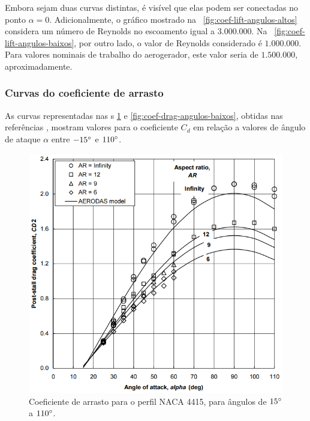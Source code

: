 \documentclass{article}
\begin{document}
	Embora sejam duas curvas distintas, é visível que elas podem ser conectadas no ponto $\alpha = 0$.
	Adicionalmente, o gráfico mostrado na \figurename\ \ref{fig:coef-lift-angulos-altos} considera um número de Reynolds no escoamento
	igual a $3.000.000$.
	Na \figurename\ \ref{fig:coef-lift-angulos-baixos}, por outro lado, o valor de Reynolds considerado é $1.000.000$.
	Para valores nominais de trabalho do aerogerador, este valor seria de $1.500.000$, aproximadamente.

	\subsubsection{Curvas do coeficiente de arrasto}
	As curvas representadas nas \figurename s \ref{fig:coef-drag-angulos-altos} e \ref{fig:coef-drag-angulos-baixos},
	obtidas nas referências \cite{airfoiltools:naca4415,spera:2008}, mostram valores para o coeficiente
	$C_d$ em relação a valores de ângulo de ataque $\alpha$ entre $-15\degree$ e $110\degree$.

	\begin{figure}[ht]
		\centering
		\includegraphics[scale=0.3]{coef-drag-angulos-altos.png}
		\caption{Coeficiente de arrasto para o perfil NACA 4415, para ângulos de $15\degree$ a $110\degree$.}
		\label{fig:coef-drag-angulos-altos}
	\end{figure}
\end{document}

